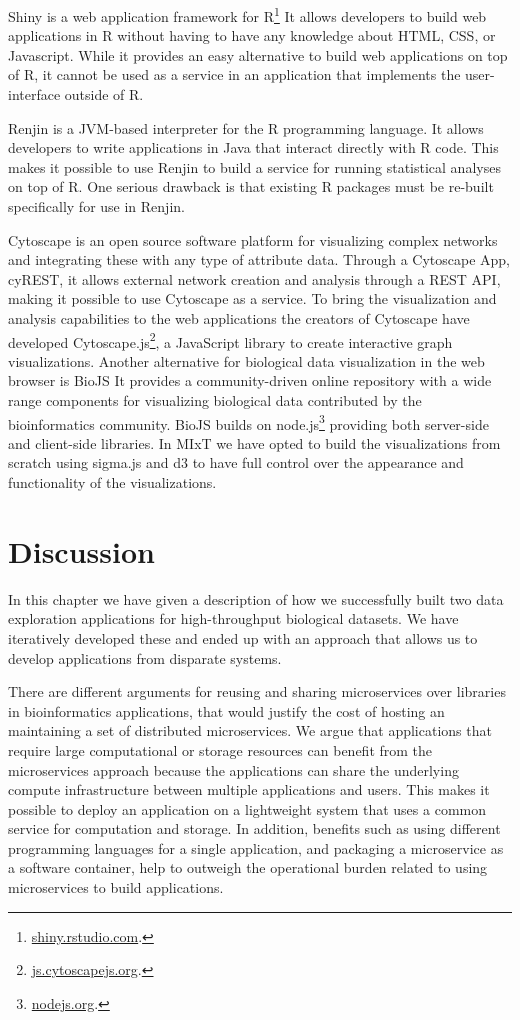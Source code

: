 Shiny is a web application framework for R\footnote{\url{shiny.rstudio.com}.}
It allows developers to build web applications in R without having to have any
knowledge about HTML, CSS, or Javascript. While it provides an easy alternative
to build web applications on top of R, it cannot be used as a service in an
application that implements the user-interface outside of R.  

Renjin is a JVM-based interpreter for the R programming language.\cite{renjin}
It allows developers to write applications in Java that interact directly with R
code. This makes it possible to use Renjin to build a service for running
statistical analyses on top of R. One serious drawback is that existing R
packages must be re-built specifically for use in Renjin. 

Cytoscape is an open source software platform for visualizing complex networks
and integrating these with any type of attribute
data.\cite{shannon2003cytoscape} Through a Cytoscape App, cyREST, it allows
external network creation and analysis through a REST API\cite{ono2015cyrest},
making it possible to use Cytoscape as a service.  To bring the visualization
and analysis capabilities to the web applications the creators of Cytoscape have
developed Cytoscape.js\footnote{\url{js.cytoscapejs.org}.}, a JavaScript library
to create interactive graph visualizations.  Another alternative for biological
data visualization in the web browser is BioJS It provides a community-driven
online repository with a wide range components for visualizing biological data
contributed by the bioinformatics community.\cite{gomez2013biojs} BioJS builds
on node.js\footnote{\url{nodejs.org}.} providing both server-side and
client-side libraries. In MIxT we have opted to build the visualizations from
scratch using sigma.js and d3 to have full control over the appearance and
functionality of the visualizations. 

\section{Discussion}
In this chapter we have given a description of how we successfully built two
data exploration applications for high-throughput biological datasets. We have
iteratively developed these and ended up with an approach that allows us to
develop applications from disparate systems. 

There are different arguments for reusing and sharing microservices over
libraries in bioinformatics applications, that would justify the cost of hosting
an maintaining a set of distributed microservices.  We argue that applications
that require large computational or storage resources can benefit from the
microservices approach because the applications can share the underlying compute
infrastructure between multiple applications and users.  This makes it possible
to deploy an application on a lightweight system that uses a common service for
computation and storage. In addition, benefits such as using different
programming languages for a single application, and packaging a microservice as
a software container, help to outweigh the operational burden related to using
microservices to build applications. 


